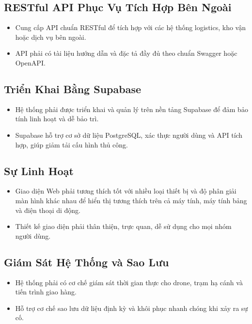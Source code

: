 \subsection{RESTful API Phục Vụ Tích Hợp Bên Ngoài}
\begin{itemize}
  \item Cung cấp API chuẩn RESTful để tích hợp với các hệ thống logistics, kho vận hoặc dịch vụ bên ngoài.
  \item API phải có tài liệu hướng dẫn và đặc tả đầy đủ theo chuẩn Swagger hoặc OpenAPI.
\end{itemize}

\subsection{Triển Khai Bằng Supabase}
\begin{itemize}
  \item Hệ thống phải được triển khai và quản lý trên nền tảng Supabase để đảm bảo tính linh hoạt và dễ bảo trì.
  \item Supabase hỗ trợ cơ sở dữ liệu PostgreSQL, xác thực người dùng và API tích hợp, giúp giảm tải cấu hình thủ công.
\end{itemize}

\subsection{Sự Linh Hoạt}
\begin{itemize}
  \item Giao diện Web phải tương thích tốt với nhiều loại thiết bị và độ phân giải màn hình khác nhau để hiển thị tương thích trên cả máy tính, máy tính bảng và điện thoại di động.
  \item Thiết kế giao diện phải thân thiện, trực quan, dễ sử dụng cho mọi nhóm người dùng.
\end{itemize}

\subsection{Giám Sát Hệ Thống và Sao Lưu}
\begin{itemize}
  \item Hệ thống phải có cơ chế giám sát thời gian thực cho drone, trạm hạ cánh và tiến trình giao hàng.
  \item Hỗ trợ cơ chế sao lưu dữ liệu định kỳ và khôi phục nhanh chóng khi xảy ra sự cố.
\end{itemize}

